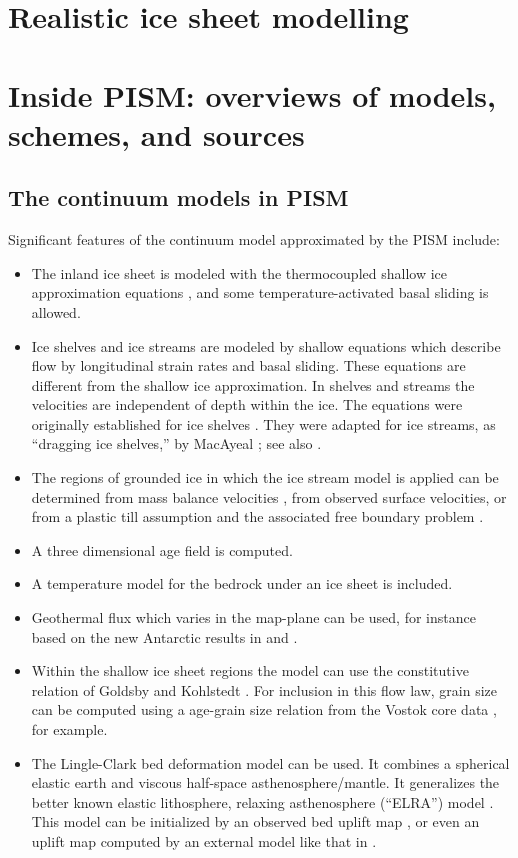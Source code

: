 \documentclass[11pt,final]{amsart}
\begin{document}
\section{Realistic ice sheet modelling}\label{sect:real}


\clearpage\newpage
\section{Inside PISM: overviews of models, schemes, and sources}\label{sect:over}

\subsection{The continuum models in PISM}  Significant features of the continuum model approximated by the PISM include:\begin{itemize}
\item The inland ice sheet is modeled with the thermocoupled shallow ice approximation equations \cite{Fowler}, and some temperature-activated basal sliding is allowed.
\item Ice shelves and ice streams are modeled by shallow equations which describe flow by longitudinal strain rates and basal sliding.  These equations are different from the shallow ice approximation.  In shelves and streams the velocities are independent of depth within the ice.  The equations were originally established for ice shelves \cite{Morland,MorlandZainuddin,MacAyealetal}.  They were adapted for ice streams, as ``dragging ice shelves,'' by MacAyeal \cite{MacAyeal}; see also \cite{HulbeMacAyeal}.
\item The regions of grounded ice in which the ice stream model is applied can be determined from mass balance velocities \cite{BamberVaughanJoughin}, from observed surface velocities, or from a plastic till assumption and the associated free boundary problem \cite{SchoofStream}.
\item A three dimensional age field is computed.
\item A temperature model for the bedrock under an ice sheet is included.
\item Geothermal flux which varies in the map-plane can be used, for instance based on the new Antarctic results in \cite{ShapiroRitzwoller} and \cite{FoxMaule}.
\item Within the shallow ice sheet regions the model can use the constitutive relation of Goldsby and Kohlstedt \cite{GoldsbyKohlstedt,Peltieretal}.  For inclusion in this flow law, grain size can be computed using a age-grain size relation from the Vostok core data \cite{VostokCore}, for example.
\item The Lingle-Clark \cite{BLKfastearth,LingleClark} bed deformation model can be used.  It combines a spherical elastic earth and viscous half-space asthenosphere/mantle.  It generalizes the better known elastic lithosphere, relaxing asthenosphere (``ELRA'') model \cite{Greve2001}.  This model can be initialized by an observed bed uplift map \cite{BLKfastearth}, or even an uplift map computed by an external model like that in \cite{IvinsJames2005}.\end{itemize}
\end{document}
